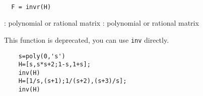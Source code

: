
\begin{mandesc}
   \\ %
\end{mandesc}
\begin{calling_sequence}
\begin{verbatim}
  F = invr(H)  
\end{verbatim}
\end{calling_sequence}
\begin{parameters}
  \begin{varlist}
    : polynomial or rational matrix
    : polynomial or rational matrix
  \end{varlist}
\end{parameters}
\begin{mandescription}
  This function is deprecated, you can use \verb!inv! directly.
\end{mandescription}
\begin{examples}
  \begin{Verbatim}
    s=poly(0,'s')
    H=[s,s*s+2;1-s,1+s]; 
    inv(H)
    H=[1/s,(s+1);1/(s+2),(s+3)/s];
    inv(H)
  \end{Verbatim}
\end{examples}
\begin{manseealso}
      
\end{manseealso}
